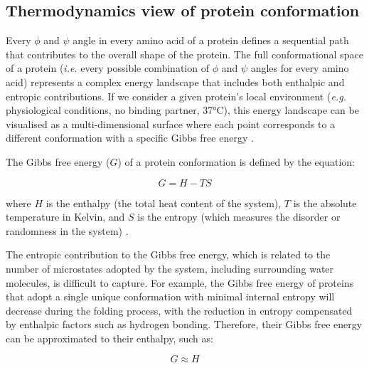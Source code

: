 \subsection{Thermodynamics view of protein conformation}
Every \(\phi\) and \(\psi\) angle in every amino acid of a protein defines a sequential path that contributes to the overall shape of the protein. The full conformational space of a protein (\textit{i.e.} every possible combination of \(\phi\) and \(\psi\) angles for every amino acid) represents a complex energy landscape that includes both enthalpic and entropic contributions. If we consider a given protein's local environment (\textit{e.g.} physiological conditions, no binding partner, 37°C), this energy landscape can be visualised as a multi-dimensional surface where each point corresponds to a different conformation with a specific Gibbs free energy \cite{dill_protein_2008}.

The Gibbs free energy (\(G\)) of a protein conformation is defined by the equation:

\begin{equation}
\label{eq:GibbsFreeEnergy}
G = H - TS
\end{equation}

where \(H\) is the enthalpy (the total heat content of the system), \(T\) is the absolute temperature in Kelvin, and \(S\) is the entropy (which measures the disorder or randomness in the system) \cite{yang_free_2013}. 

The entropic contribution to the Gibbs free energy, which is related to the number of microstates adopted by the system, including surrounding water molecules, is difficult to capture. For example, the Gibbs free energy of proteins that adopt a single unique conformation with minimal internal entropy will decrease during the folding process, with the reduction in entropy compensated by enthalpic factors such as hydrogen bonding. Therefore, their Gibbs free energy can be approximated to their enthalpy, such as:

\begin{equation}
\label{eq:GibbsFreeEnergy_only_enthalpy}
G \approx H
\end{equation}



